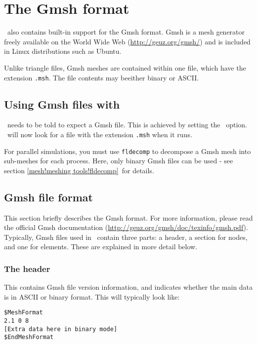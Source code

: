 \section{The Gmsh format}\label{sect:gmsh_format}


\fluidity\ also contains built-in support for the Gmsh format. Gmsh is a mesh
generator freely available on the World Wide Web
(\url{http://geuz.org/gmsh/}) and is included in
Linux distributions such as Ubuntu. 

Unlike triangle files, Gmsh meshes are contained within one file, which have
the extension \lstinline[language=bash]+.msh+. The file contents may
beeither binary or ASCII.

\subsection{Using Gmsh files with \fluidity}\label{sect:using_gmsh}

\fluidity\ needs to be told to expect a Gmsh file. This is achieved by
setting the \onlypdf\linebreak{}\ option.  \fluidity\
will now look for a file with the extension \lstinline[language=bash]+.msh+ when it runs.

For parallel simulations, you must use \lstinline[language=bash]+fldecomp+ to decompose a Gmsh
mesh into sub-meshes for each process. Here, only binary Gmsh files can be
used - see section \ref{mesh!meshing tools!fldecomp}\ for details.

\subsection{Gmsh file format}\label{sect:gmsh_file_format}

This section briefly describes the Gmsh format. For more
information, please read the official Gmsh documentation
(\url{http://geuz.org/gmsh/doc/texinfo/gmsh.pdf}).
Typically, Gmsh files used in \fluidity\ contain three parts: a header, a
section for nodes, and one for elements. These are explained in more detail
below.



\subsubsection*{The header}\label{sect:gmsh_header_section}
This contains Gmsh file version information, and indicates whether the main data is in ASCII or binary format. This will typically look like:
\begin{lstlisting}
$MeshFormat
2.1 0 8
[Extra data here in binary mode]
$EndMeshFormat
\end{lstlisting}

